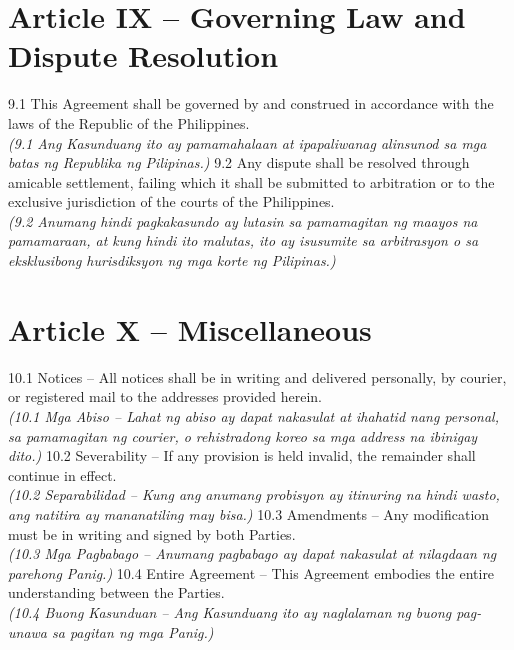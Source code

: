 \documentclass[a4paper,12pt]{article}
\begin{document}
\section*{Article IX – Governing Law and Dispute Resolution}
9.1 This Agreement shall be governed by and construed in accordance with the laws of the Republic of the Philippines. \\
\textit{(9.1 Ang Kasunduang ito ay pamamahalaan at ipapaliwanag alinsunod sa mga batas ng Republika ng Pilipinas.)}
9.2 Any dispute shall be resolved through amicable settlement, failing which it shall be submitted to arbitration or to the exclusive jurisdiction of the courts of the Philippines. \\
\textit{(9.2 Anumang hindi pagkakasundo ay lutasin sa pamamagitan ng maayos na pamamaraan, at kung hindi ito malutas, ito ay isusumite sa arbitrasyon o sa eksklusibong hurisdiksyon ng mga korte ng Pilipinas.)}
\section*{Article X – Miscellaneous}
10.1 Notices – All notices shall be in writing and delivered personally, by courier, or registered mail to the addresses provided herein. \\
\textit{(10.1 Mga Abiso – Lahat ng abiso ay dapat nakasulat at ihahatid nang personal, sa pamamagitan ng courier, o rehistradong koreo sa mga address na ibinigay dito.)}
10.2 Severability – If any provision is held invalid, the remainder shall continue in effect. \\
\textit{(10.2 Separabilidad – Kung ang anumang probisyon ay itinuring na hindi wasto, ang natitira ay mananatiling may bisa.)}
10.3 Amendments – Any modification must be in writing and signed by both Parties. \\
\textit{(10.3 Mga Pagbabago – Anumang pagbabago ay dapat nakasulat at nilagdaan ng parehong Panig.)}
10.4 Entire Agreement – This Agreement embodies the entire understanding between the Parties. \\
\textit{(10.4 Buong Kasunduan – Ang Kasunduang ito ay naglalaman ng buong pag-unawa sa pagitan ng mga Panig.)}
\end{document}
